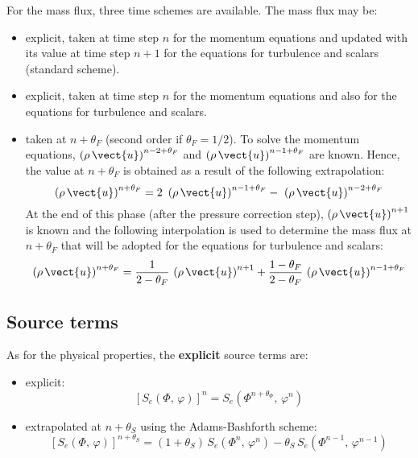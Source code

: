 For the mass flux, three time schemes are available. The mass flux may be:
%
\begin{itemize}
\item explicit, taken at time step $n$ for the momentum equations and
updated with its value at time step $n+1$ for the equations for turbulence
and scalars (standard scheme).

\item explicit, taken at time step $n$ for the momentum equations and
also for the equations for turbulence and scalars.

\item taken at $n+\theta_{F}$ (second order if $\theta_{F}=1/2$). To
solve the momentum equations, $\left(\rho\,\vect{u}\right)^{n-2+\theta_{F}}$ and $%
\left(\rho\,\vect{u}\right)^{n-1+\theta_{F}}$ are known. Hence, the value at $%
n+\theta_{F}$ is obtained as a result of the following extrapolation:
\begin{equation}
\left(\rho\,\vect{u}\right)^{n+\theta_{F}}= 2\,\,\left(\rho\,\vect{u}%
\right)^{n-1+\theta_{F}} -\,\,\left(\rho\,\vect{u}\right)^{n-2+\theta_{F}}
\end{equation}
At the end of this phase (after the pressure correction step), $\left(\rho\,%
\vect{u}\right)^{n+1}$ is known and the following interpolation is used to
determine the mass flux at $n+\theta_{F}$ that will be adopted for the
equations for turbulence and scalars:
\begin{equation}
\left(\rho\,\vect{u}\right)^{n+\theta_{F}}= \frac{1}{2-\theta_{F}}\,\left(\rho\,%
\vect{u}\right)^{n+1} +\frac{1-\theta_{F}}{2-\theta_{F}}\,\left(\rho\,\vect{u}%
\right)^{n-1+\theta_{F}}
\end{equation}
\end{itemize}

\subsection{Source terms}

As for the physical properties, the \textbf{explicit} source terms are:

\begin{itemize}
\item explicit:
\begin{equation}
\left[ S_{e} \left(\Phi , \, \varphi \right) \right]^{n}=S_{e}\left(\Phi ^{n+\theta_{\Phi }}, \, \varphi
^{n} \right)
\end{equation}

\item extrapolated at $n+\theta _{S}$ using the Adams-Bashforth scheme:
\begin{equation}
\left[ S_{e} \left(\Phi , \, \varphi \right) \right]^{n+\theta _{S}}=\left(1+\theta _{S}\right)\,
S_{e}\left(\Phi^{n}, \, \varphi^{n}\right)-\theta _{S}\,S_{e} \left(\Phi ^{n-1} , \,\varphi ^{n-1}\right)
\end{equation}
\end{itemize}

